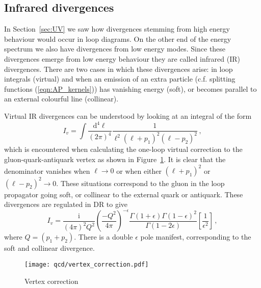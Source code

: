 \documentclass[main.tex]{subfiles}
\begin{document}
\subsection{Infrared divergences}
    In Section~\ref{sec:UV} we saw how divergences
    stemming from high energy behaviour would occur
    in loop diagrams. On the other end of the energy
    spectrum we also have divergences from low energy
    modes. Since these divergences emerge from low energy
    behaviour they are called infrared (IR) divergences. There
    are two cases in which these divergences arise:
    in loop integrals (virtual) and when an emission
    of an extra particle (c.f. splitting functions
    (\ref{eqn:AP_kernels})) has vanishing energy (soft),
    or becomes parallel to an external colourful line (collinear).

    Virtual IR divergences can be understood by looking
    at an integral of the form
    \begin{equation}\label{eqn:virtual_IR_integral}
        I_{v} = \int \dfrac{\mathrm{d}^{4}\ell}{(2\pi)^{4}} \dfrac{1}{\ell^{2}(\ell+p_{1})^{2}(\ell-p_{2})^{2}} \, ,
    \end{equation}
    which is encountered when calculating the one-loop
    virtual correction to the gluon-quark-antiquark vertex
    as shown in Figure~\ref{fig:vertex_correction}.
    It is clear that the denominator vanishes when $\ell \rightarrow 0$
    or when either $(\ell + p_{1})^{2}$ or $(\ell - p_{2})^{2} \rightarrow 0$.
    These situations correspond to the gluon in the loop propagator
    going soft, or collinear to the external quark or antiquark.
    These divergences are regulated in DR to give
    \begin{equation}\label{eqn:virtual_IR_DR}
        I_{v} = \dfrac{\mathrm{i}}{(4\pi)^{2}Q^{2}}\left(\dfrac{-Q^{2}}{4\pi}\right)^{-\epsilon}\dfrac{\Gamma(1+\epsilon)\Gamma(1-\epsilon)^{2}}{\Gamma(1-2\epsilon)}\left[\dfrac{1}{\epsilon^{2}}\right] \, ,
    \end{equation}
    where $Q = (p_{1} + p_{2})$. There is a double $\epsilon$ pole manifest,
    corresponding to the soft and collinear divergence.

    \begin{figure}
        \texttt{[image: qcd/vertex\_correction.pdf]}
        \caption{Vertex correction}
        \label{fig:vertex_correction}
    \end{figure}
\end{document}
